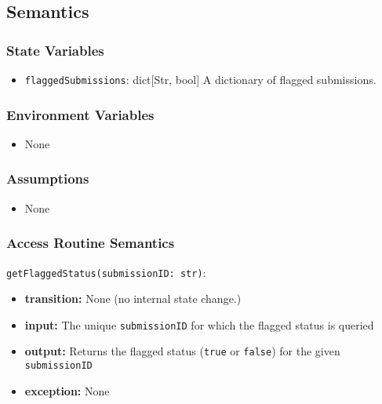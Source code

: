 \documentclass[12pt, titlepage]{article}
\begin{document}
\subsection{Semantics}

\subsubsection{State Variables}

\begin{itemize}
    \item \texttt{flaggedSubmissions}: dict[Str, bool] A dictionary of flagged submissions.
\end{itemize}

\subsubsection{Environment Variables}

\begin{itemize}
  \item None
\end{itemize}

\subsubsection{Assumptions}

\begin{itemize}
    \item None
\end{itemize}

\subsubsection{Access Routine Semantics}

\noindent \texttt{getFlaggedStatus(submissionID: str)}:
\begin{itemize}
    \item \textbf{transition:} None (no internal state change.)
    \item \textbf{input:} The unique \texttt{submissionID} for which the flagged status is queried
    \item \textbf{output:} Returns the flagged status (\texttt{true} or \texttt{false}) for the given \texttt{submissionID}
    \item \textbf{exception:} None
\end{itemize}
\end{document}

